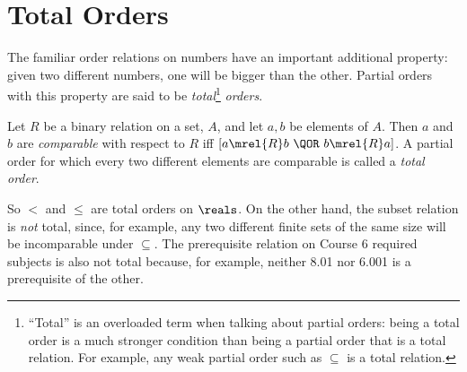 \begin{problems}
\classproblems
{}

\homeworkproblems
{}
\end{problems}


\section{Total Orders}

The familiar order relations on numbers have an important additional
property: given two different numbers, one will be bigger than the other.
Partial orders with this property are said to be
\emph{total}\footnote{``Total'' is an overloaded term when talking about
  partial orders: being a total order is a much stronger condition than
  being a partial order that is a total relation.  For example, any weak
  partial order such as $\subseteq$ is a total relation.} \emph{orders}.


\begin{definition}
Let $R$ be a binary relation on a set, $A$, and let $a, b$ be elements of
$A$.  Then $a$ and $b$ are \emph{comparable} with respect to $R$ iff $[a
  \mrel{R} b\ \QOR\ b \mrel{R} a]$.  A partial order for which every two
different elements are comparable is called a \emph{total order}.
\end{definition}

So $<$ and $\le$ are total orders on $\reals$.  On the other hand, the
subset relation is \emph{not} total, since, for example, any two different
finite sets of the same size will be incomparable under $\subseteq$.  The
prerequisite relation on Course 6 required subjects is also not total
because, for example, neither 8.01 nor 6.001 is a prerequisite of the
other.

\begin{problems}
\practiceproblems
{}

\classproblems
{}

\homeworkproblems
{}

\examproblems
{}

\end{problems}



